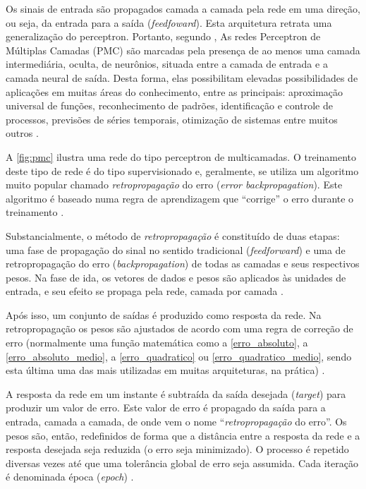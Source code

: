 Os sinais de entrada são propagados camada a camada pela rede em uma direção, ou seja, da entrada para a saída (\textit{feedfoward}). Esta arquitetura retrata uma generalização do perceptron. Portanto, segundo , As redes Perceptron de Múltiplas Camadas (PMC) são marcadas pela presença de ao menos uma camada intermediária, oculta, de neurônios, situada entre a camada de entrada e a camada neural de saída. Desta forma, elas possibilitam elevadas possibilidades de aplicações em muitas áreas do conhecimento, entre as principais: aproximação universal de funções, reconhecimento de padrões, identificação e controle de processos, previsões de séries temporais, otimização de sistemas entre muitos outros \cite{haykin_redes_2001}.

A \autoref{fig:pmc} ilustra uma rede do tipo perceptron de multicamadas. O treinamento deste tipo de rede é do tipo supervisionado e, geralmente, se utiliza um algoritmo muito popular chamado \textit{retropropagação} do erro (\textit{error backpropagation}). Este algoritmo é baseado numa regra de aprendizagem que “corrige” o erro durante o treinamento \cite{haykin_redes_2001}.

Substancialmente, o método de \textit{retropropagação} é constituído de duas etapas: uma fase de propagação do sinal no sentido tradicional (\textit{feedforward}) e uma de retropropagação do erro (\textit{backpropagation}) de todas as camadas e seus respectivos pesos. Na fase de ida, os vetores de dados e pesos são aplicados às unidades de entrada, e seu efeito se propaga pela rede, camada por camada \cite{hagan_neural_1996} \cite{haykin_redes_2001}.

Após isso, um conjunto de saídas é produzido como resposta da rede. Na retropropagação os pesos são ajustados de acordo com uma regra de correção de erro (normalmente uma função matemática como a \autoref{erro_absoluto}, a \autoref{erro_absoluto_medio}, a \autoref{erro_quadratico} ou \autoref{erro_quadratico_medio}, sendo esta última uma das mais utilizadas em muitas arquiteturas, na prática) \cite{haykin_redes_2001} \cite{hagan_neural_1996} \cite{yeung_neural_2004}.

A resposta da rede em um instante é subtraída da saída desejada (\textit{target}) para produzir um valor de erro. Este valor de erro é propagado da saída para a entrada, camada a camada, de onde vem o nome ``\textit{retropropagação} do erro''. Os pesos são, então, redefinidos de forma que a distância entre a resposta da rede e a resposta desejada seja reduzida (o erro seja minimizado). O processo é repetido diversas vezes até que uma tolerância global de erro seja assumida. Cada iteração é denominada época (\textit{epoch}) \cite{haykin_redes_2001} \cite{hagan_neural_1996} \cite{minsky_perceptrons:_1969}.


